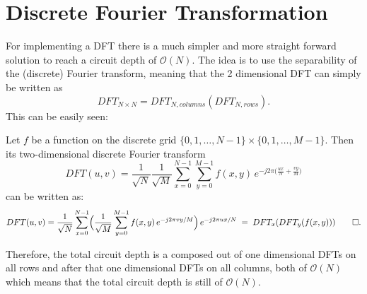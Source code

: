 \section{Discrete Fourier Transformation}
For implementing a DFT there is a much simpler and more straight forward solution to reach a circuit depth of $\mathcal{O}(N)$. The idea is to use the separability of the (discrete) Fourier transform, meaning that the 2 dimensional DFT can simply be written as 
\[
    DFT_{N\times N}= DFT_{N,columns}(DFT_{N,rows}).
\]
This can be easily seen:
\begin{theorem}
Let \(f\) be a function on the discrete grid \(\{0,1,\dots,N-1\}\times\{0,1,\dots,M-1\}\).
Then its two-dimensional discrete Fourier transform
\[
DFT(u,v)
=\frac{1}{\sqrt{N}}\frac{1}{\sqrt{M}}\sum_{x=0}^{N-1}\sum_{y=0}^{M-1}f(x,y)\,e^{-j2\pi\bigl(\tfrac{u x}{N}+\tfrac{v y}{M}\bigr)}
\]
can be written as:
\[
DFT(u,v)
=\frac{1}{\sqrt{N}}\sum_{x=0}^{N-1}\Bigl(\frac{1}{\sqrt{M}}\sum_{y=0}^{M-1}f(x,y)\,e^{-j2\pi vy/M}\Bigr)\,e^{-j2\pi ux/N}
\;=\;DFT_x(DFT_y(f(x,y))) \tag*{\(\square\).}
\]
\end{theorem}

Therefore, the total circuit depth is a composed out of one dimensional DFTs on all rows and after that one dimensional DFTs on all columns, both of $\mathcal{O}(N)$ which means that the total circuit depth is still of $\mathcal{O}(N)$.